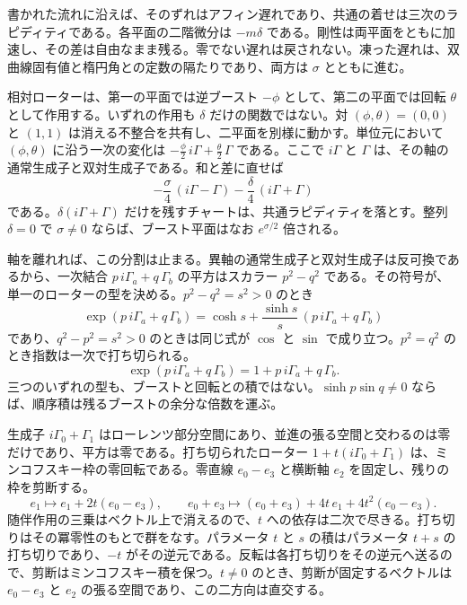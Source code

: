 \documentclass[a4paper]{article}
\begin{document}
書かれた流れに沿えば、そのずれはアフィン遅れであり、共通の着せは三次のラピディティである。各平面の二階微分は \(-m\delta\) である。剛性は両平面をともに加速し、その差は自由なまま残る。零でない遅れは戻されない。凍った遅れは、双曲線固有値と楕円角との定数の隔たりであり、両方は \(\sigma\) とともに進む。

相対ローターは、第一の平面では逆ブースト \(-\phi\) として、第二の平面では回転 \(\theta\) として作用する。いずれの作用も \(\delta\) だけの関数ではない。対 \((\phi,\theta)=(0,0)\) と \((1,1)\) は消える不整合を共有し、二平面を別様に動かす。単位元において \((\phi,\theta)\) に沿う一次の変化は \(-\frac\phi2\,i\Gamma+\frac\theta2\,\Gamma\) である。ここで \(i\Gamma\) と \(\Gamma\) は、その軸の通常生成子と双対生成子である。和と差に直せば
\[
-\frac\sigma4\,(i\Gamma-\Gamma)-\frac\delta4\,(i\Gamma+\Gamma)
\]
である。\(\delta(i\Gamma+\Gamma)\) だけを残すチャートは、共通ラピディティを落とす。整列 \(\delta=0\) で \(\sigma\neq 0\) ならば、ブースト平面はなお \(e^{\sigma/2}\) 倍される。

軸を離れれば、この分割は止まる。異軸の通常生成子と双対生成子は反可換であるから、一次結合 \(p\,i\Gamma_a+q\,\Gamma_b\) の平方はスカラー \(p^2-q^2\) である。その符号が、単一のローターの型を決める。\(p^2-q^2=s^2>0\) のとき
\[
\exp(p\,i\Gamma_a+q\,\Gamma_b)
  =\cosh s+\frac{\sinh s}{s}\,(p\,i\Gamma_a+q\,\Gamma_b)
\]
であり、\(q^2-p^2=s^2>0\) のときは同じ式が \(\cos\) と \(\sin\) で成り立つ。\(p^2=q^2\) のとき指数は一次で打ち切られる。
\[
\exp(p\,i\Gamma_a+q\,\Gamma_b)
  =1+p\,i\Gamma_a+q\,\Gamma_b.
\]
三つのいずれの型も、ブーストと回転との積ではない。\(\sinh p\sin q\neq 0\) ならば、順序積は残るブーストの余分な倍数を運ぶ。

生成子 \(i\Gamma_0+\Gamma_1\) はローレンツ部分空間にあり、並進の張る空間と交わるのは零だけであり、平方は零である。打ち切られたローター \(1+t(i\Gamma_0+\Gamma_1)\) は、ミンコフスキー枠の零回転である。零直線 \(e_0-e_3\) と横断軸 \(e_2\) を固定し、残りの枠を剪断する。
\begin{equation}
e_1\mapsto e_1+2t(e_0-e_3),
\qquad
e_0+e_3\mapsto (e_0+e_3)+4t\,e_1+4t^2(e_0-e_3).
\label{eq:null-rotation}
\end{equation}
随伴作用の三乗はベクトル上で消えるので、\(t\) への依存は二次で尽きる。打ち切りはその冪零性のもとで群をなす。パラメータ \(t\) と \(s\) の積はパラメータ \(t+s\) の打ち切りであり、\(-t\) がその逆元である。反転は各打ち切りをその逆元へ送るので、剪断はミンコフスキー積を保つ。\(t\neq 0\) のとき、剪断が固定するベクトルは \(e_0-e_3\) と \(e_2\) の張る空間であり、この二方向は直交する。
\end{document}
